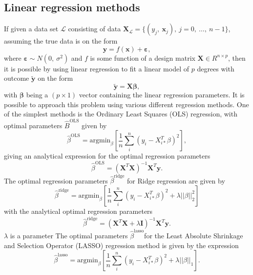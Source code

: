 \documentclass[a4paper, 10pt]{article}
\begin{document}
\begin{multicols}{2}
\subsection{Linear regression methods}
If given a data set $\mathcal{L}$ consisting of data $\bm{X}_\mathcal{L} = \{(y_j,\ \bm{x}_j),\ j=0,\ \dots,\ n-1\}$, assuming the true data is on the form
\[
\bm{y} = f(\bm{x})+ \bm{\varepsilon} ,
\]
where $\bm{\varepsilon} \sim N(0,\ \sigma ^2)$ and $f$ is some function of a design matrix $\bm{X}\in R^{n\times p}$, then it is possible by using linear regression to fit a linear model of $p$ degrees with outcome $\bm{\tilde{y}}$ on the form
\[
\bm{\tilde{y}} = \bm{X}\bm{\beta},
\]
with $\bm{\beta}$ being a $(p\times 1)$ vector containing the linear regression parameters.
It is possible to approach this problem using various different regression methods. One of the simplest methods is the Ordinary Least Squares (OLS) regression, with optimal  parameters $\hat{B}^\text{OLS}$ given by
\begin{equation}
    \hat{\beta}^\text{OLS} = \text{argmin}_{ {\beta} } \left[ \frac{1}{n} \sum_i^n (y_i - X_{i*}^T \beta)^2 \right],
    \label{eq:argminbeta_OLS}
\end{equation}
giving an analytical expression for the optimal regression parameters
\begin{equation}
    \hat{\beta}^{\text{OLS}} = (\bm{X}^T\bm{X})^{-1} \bm{X}^T \bm{y}.
    \label{eq:beta_OLS}
\end{equation}
The optimal regression parameters $\hat{\beta}^\text{ridge}$ for Ridge regression are given by
\begin{equation}
    \hat{\beta}^\text{ridge} = \text{argmin}_\beta \left[ \frac{1}{n}\sum_i^n(y_i-X_{i*}^T\beta)^2 + \lambda ||\beta||_2^2  \right]
    \label{eq:argminbeta_ridge}
\end{equation}
with the analytical optimal regression parameters
\begin{equation}
    \hat{\beta}^\text{ridge} = (\bm{X}^T\bm{X} +\lambda \bm{I})^{-1} \bm{X}^T \bm{y}.
    \label{eq:beta_ridge}
\end{equation}
$\lambda$ is a parameter 
The optimal parameters $\hat{\beta}^\text{lasso} $for the Least Absolute Shrinkage and Selection Operator (LASSO) regression method is given by the expression
\begin{equation}
    \hat{\beta}^\text{lasso} =  \text{argmin}_\beta \left[  \frac{1}{n}\sum_i^n(y_i-X_{i*}^T\beta)^2 + \lambda ||\beta||_1  \right].
    \label{eq:argminbeta_lasso}
\end{equation}


\end{multicols}
\end{document}
